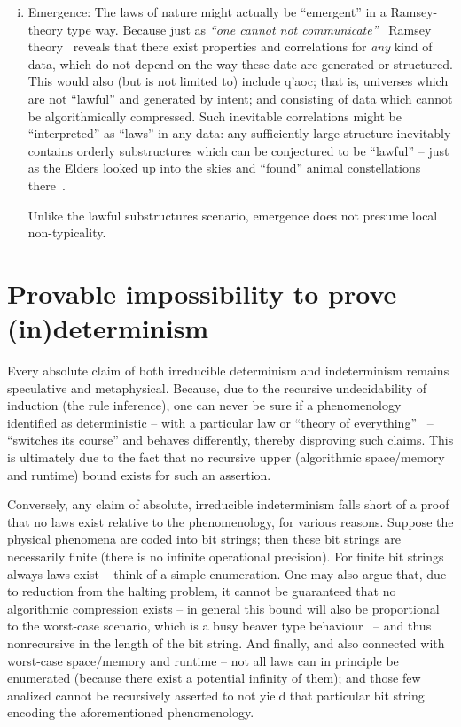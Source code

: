 \begin{enumerate}[(i)]
\item  Emergence:
The laws of nature might actually be ``emergent'' in a Ramsey-theory type way.
Because just as  {\em ``one cannot not communicate''}~\cite[\S~2.24, p.~51]{Watzlawick-1967}
Ramsey theory~\cite{Ramsey-GRS-90,landman+robertson2004,Soifer} reveals that there exist  properties
and correlations for {\em any} kind of data, which do not depend on the way these date are generated or structured.
This would also (but is not limited to) include \textgreek{q'aoc}; that is, universes
which are not ``lawful'' and generated by intent; and consisting of data which cannot be algorithmically compressed.
Such inevitable correlations might be ``interpreted'' as ``laws'' in any data:
any sufficiently large structure inevitably
contains orderly substructures which can be conjectured to be ``lawful''  -- just as the Elders looked up into the skies and
``found'' animal constellations there~\cite{GS-90}.

Unlike the lawful substructures scenario, emergence does not presume local non-typicality.

\end{enumerate}



\section{Provable impossibility to prove (in)determinism}

Every absolute claim of both irreducible determinism and indeterminism remains speculative and metaphysical.
Because, due to the recursive undecidability of induction (the rule inference),
one can never be sure if a phenomenology identified as deterministic -- with a particular law or ``theory of everything''~\cite{barrow-TOE} --
 ``switches its course'' and behaves differently, thereby disproving such claims.
This is ultimately due to the fact that no recursive upper (algorithmic space/memory and runtime) bound exists for such an assertion.

Conversely, any claim of absolute, irreducible indeterminism
falls short of a proof that no laws exist relative to the phenomenology,
for various reasons.
Suppose the physical phenomena are coded into bit strings; then these bit strings are necessarily finite (there is no infinite operational precision).
For finite bit strings always laws exist -- think of a simple enumeration.
One may also argue that, due to reduction from the halting problem,
it cannot be guaranteed that no algorithmic compression exists -- in general this bound will also be proportional to
the worst-case scenario, which is a busy beaver 
type behaviour~\cite{chaitin-bb} -- and thus nonrecursive in the length of the bit string.
And finally, and also connected with worst-case space/memory and runtime --
not all laws can in principle be enumerated (because there exist a potential infinity of them);
and those few analized cannot be recursively asserted to not yield that particular bit string encoding the aforementioned phenomenology.


